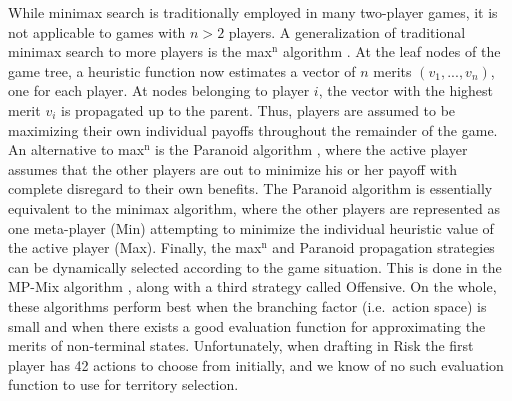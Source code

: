 \documentclass[letterpaper]{article}
\numberwithin{equation}{section}
\numberwithin{theorem}{section}
\numberwithin{lemma}{section}
\numberwithin{df}{section}
\begin{document}

While minimax search is traditionally employed in many two-player games, it is not applicable to games with $n > 2$ players.  A generalization of traditional minimax search to more players is the max$^\text{n}$ algorithm \cite{MaxN}.  At the leaf nodes of the game tree, a heuristic function now estimates a vector of $n$ merits $(v_1, ..., v_n)$, one for each player.  At nodes belonging to player $i$, the vector with the highest merit $v_i$ is propagated up to the parent.  Thus, players are assumed to be maximizing their own individual payoffs throughout the remainder of the game.  An alternative to max$^\text{n}$ is the Paranoid algorithm \cite{Paranoid}, where the active player assumes that the other players are out to minimize his or her payoff with complete disregard to their own benefits.  The Paranoid algorithm is essentially equivalent to the minimax algorithm, where the other players are represented as one meta-player (Min) attempting to minimize the individual heuristic value of the active player (Max).  Finally, the max$^\text{n}$ and Paranoid propagation strategies can be dynamically selected according to the game situation.  This is done in the MP-Mix algorithm \cite{ZuckFelnerKraus2009}, along with a third strategy called Offensive.  On the whole, these algorithms perform best when the branching factor (i.e.~action space) is small and when there exists a good evaluation function for approximating the merits of non-terminal states.  Unfortunately, when drafting in Risk the first player has 42 actions to choose from initially, and we know of no such evaluation function to use for territory selection.

\end{document}
